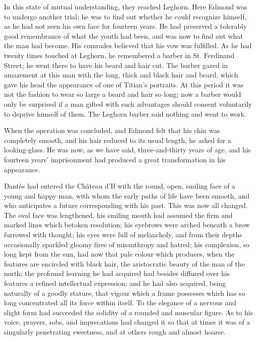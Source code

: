 In this state of mutual understanding, they reached Leghorn. Here Edmond was to undergo another trial; he was to find out whether he could recognize himself, as he had not seen his own face for fourteen years. He had preserved a tolerably good remembrance of what the youth had been, and was now to find out what the man had become. His comrades believed that his vow was fulfilled. As he had twenty times touched at Leghorn, he remembered a barber in St. Ferdinand Street; he went there to have his beard and hair cut. The barber gazed in amazement at this man with the long, thick and black hair and beard, which gave his head the appearance of one of Titian's portraits. At this period it was not the fashion to wear so large a beard and hair so long; now a barber would only be surprised if a man gifted with such advantages should consent voluntarily to deprive himself of them. The Leghorn barber said nothing and went to work. 

 When the operation was concluded, and Edmond felt that his chin was completely smooth, and his hair reduced to its usual length, he asked for a looking-glass. He was now, as we have said, three-and-thirty years of age, and his fourteen years' imprisonment had produced a great transformation in his appearance. 

 Dantès had entered the Château d'If with the round, open, smiling face of a young and happy man, with whom the early paths of life have been smooth, and who anticipates a future corresponding with his past. This was now all changed. The oval face was lengthened, his smiling mouth had assumed the firm and marked lines which betoken resolution; his eyebrows were arched beneath a brow furrowed with thought; his eyes were full of melancholy, and from their depths occasionally sparkled gloomy fires of misanthropy and hatred; his complexion, so long kept from the sun, had now that pale colour which produces, when the features are encircled with black hair, the aristocratic beauty of the man of the north; the profound learning he had acquired had besides diffused over his features a refined intellectual expression; and he had also acquired, being naturally of a goodly stature, that vigour which a frame possesses which has so long concentrated all its force within itself.  To the elegance of a nervous and slight form had succeeded the solidity of a rounded and muscular figure. As to his voice, prayers, sobs, and imprecations had changed it so that at times it was of a singularly penetrating sweetness, and at others rough and almost hoarse. 

